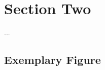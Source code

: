 \clearpage
\section{Section Two}
\label{sec:Section_Name}
...
\subsection{Exemplary Figure}
\label{subsec:Section_Name/fig}
